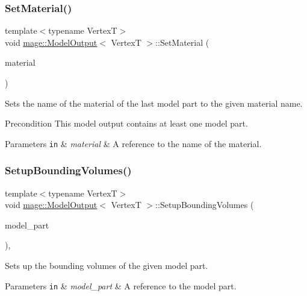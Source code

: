 \subsubsection{\texorpdfstring{Set\+Material()}{SetMaterial()}}
{\footnotesize\ttfamily template$<$typename VertexT$>$ \\
void \hyperlink{structmage_1_1_model_output}{mage\+::\+Model\+Output}$<$ VertexT $>$\+::Set\+Material (\begin{DoxyParamCaption}\item[{const string \&}]{material }\end{DoxyParamCaption})}

Sets the name of the material of the last model part to the given material name.

\begin{DoxyPrecond}{Precondition}
This model output contains at least one model part. 
\end{DoxyPrecond}

\begin{DoxyParams}[1]{Parameters}
\mbox{\tt in}  & {\em material} & A reference to the name of the material. \\
\hline
\end{DoxyParams}
\hypertarget{structmage_1_1_model_output_aec05a0a43d141b8b8260e741314615c1}{}\label{structmage_1_1_model_output_aec05a0a43d141b8b8260e741314615c1} 
\subsubsection{\texorpdfstring{Setup\+Bounding\+Volumes()}{SetupBoundingVolumes()}}
{\footnotesize\ttfamily template$<$typename VertexT$>$ \\
void \hyperlink{structmage_1_1_model_output}{mage\+::\+Model\+Output}$<$ VertexT $>$\+::Setup\+Bounding\+Volumes (\begin{DoxyParamCaption}\item[{\hyperlink{structmage_1_1_model_part}{Model\+Part} \&}]{model\+\_\+part }\end{DoxyParamCaption})\hspace{0.3cm}{\ttfamily [private]}, {\ttfamily [noexcept]}}

Sets up the bounding volumes of the given model part.


\begin{DoxyParams}[1]{Parameters}
\mbox{\tt in}  & {\em model\+\_\+part} & A reference to the model part. \\
\hline
\end{DoxyParams}
\hypertarget{structmage_1_1_model_output_a9e4d94547fbc318961d8c695149cdf14}{}\label{structmage_1_1_model_output_a9e4d94547fbc318961d8c695149cdf14} 
